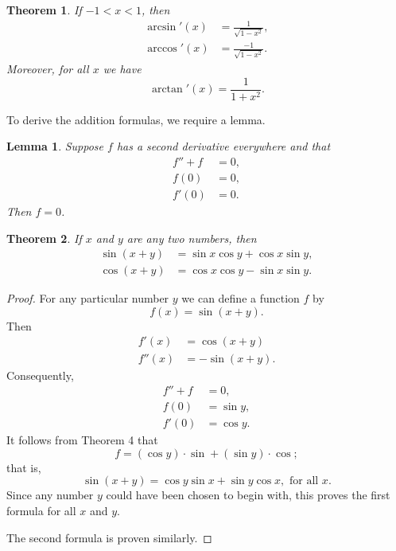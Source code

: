 \documentclass{article}
\newtheorem*{lemma*}{Lemma}
\newtheorem{theorem}{Theorem}
\begin{document}
\begin{theorem}
  If $-1 < x < 1$, then
  \begin{align*}
    \arcsin'(x) &= \frac{1}{\sqrt{1 - x^2}}, \\
    \arccos'(x) &= \frac{-1}{\sqrt{1 - x^2}}.
  \end{align*}
  Moreover, for all $x$ we have \[
    \arctan'(x) = \frac{1}{1 + x^2}.
  \]
\end{theorem}

To derive the addition formulas, we require a lemma.

\begin{lemma*}
  Suppose $f$ has a second derivative everywhere and that
  \begin{align*}
    f'' + f &= 0, \\
    f(0) &= 0, \\
    f'(0) &= 0.
  \end{align*}
  Then $f = 0$.
\end{lemma*}

\begin{theorem}
  If $x$ and $y$ are any two numbers, then \begin{align*}
    \sin(x + y) &= \sin x \cos y + \cos x \sin y, \\
    \cos(x + y) &= \cos x \cos y - \sin x \sin y.
  \end{align*}
\end{theorem}

\begin{proof}
  For any particular number $y$ we can define a function $f$ by \[
    f(x) = \sin(x + y).
  \] Then
  \begin{align*}
    f'(x) &= \cos(x + y) \\
    f''(x) &= -\sin(x + y).
  \end{align*}
  Consequently,
  \begin{align*}
    f'' + f &= 0, \\
    f(0)    &= \sin y, \\
    f'(0)   &= \cos y.
  \end{align*}
  It follows from Theorem 4 that \[
    f = (\cos y ) \cdot \sin{} + (\sin y) \cdot \cos{};
  \] that is, \[
    \sin(x + y) = \cos y \sin x + \sin y \cos x, \text{ for all } x.
  \] Since any number $y$ could have been chosen to begin with, this proves the
  first formula for all $x$ and $y$.

  The second formula is proven similarly.
\end{proof}
\end{document}
